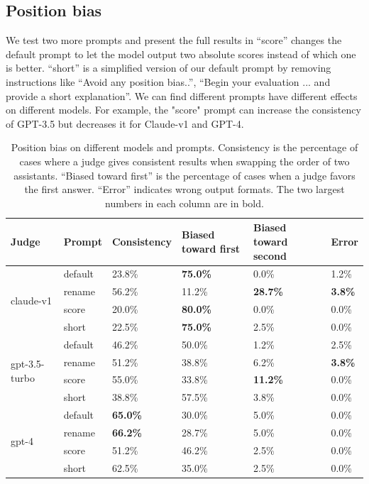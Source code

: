 \subsection{Position bias}
\label{subsec:additional-position-bias}
We test two more prompts and present the full results in 
``score'' changes the default prompt to let the model output two absolute scores instead of which one is better.
``short'' is a simplified version of our default prompt by removing instructions like ``Avoid any position bias..'', ``Begin your evaluation ... and provide a short explanation''.
We can find different prompts have different effects on different models.
For example, the "score" prompt can increase the consistency of GPT-3.5 but decreases it for Claude-v1 and GPT-4.

\begin{table}[h]
\centering
\footnotesize
\caption{Position bias on different models and prompts. Consistency is the percentage of cases where a judge gives consistent results when swapping the order of two assistants. ``Biased toward first'' is the percentage of cases when a judge favors the first answer. ``Error'' indicates wrong output formats. The two largest numbers in each column are in bold.}
\label{tab:position_bias_more_prompt}
\begin{tabular}{@{}llllll@{}}
\toprule
Judge & Prompt  & Consistency & Biased toward first & Biased toward second & Error \\
\midrule
\multirow{4}{*}{claude-v1} & default & 23.8\% & \textbf{75.0\%} & 0.0\% & 1.2\% \\
 & rename & 56.2\% & 11.2\% & \textbf{28.7\%} & \textbf{3.8\%} \\
 & score & 20.0\% & \textbf{80.0\%} & 0.0\% & 0.0\% \\
 & short & 22.5\% & \textbf{75.0\%} & 2.5\% & 0.0\% \\
\midrule
\multirow{4}{*}{gpt-3.5-turbo} & default & 46.2\% & 50.0\% & 1.2\% & 2.5\% \\
 & rename & 51.2\% & 38.8\% & 6.2\% & \textbf{3.8\%} \\
 & score & 55.0\% & 33.8\% & \textbf{11.2\%} & 0.0\% \\
 & short & 38.8\% & 57.5\% & 3.8\% & 0.0\% \\
\midrule
\multirow{4}{*}{gpt-4} & default & \textbf{65.0\%} & 30.0\% & 5.0\% & 0.0\% \\
 & rename & \textbf{66.2\%} & 28.7\% & 5.0\% & 0.0\% \\
 & score & 51.2\% & 46.2\% & 2.5\% & 0.0\% \\
 & short & 62.5\% & 35.0\% & 2.5\% & 0.0\% \\
\bottomrule
\end{tabular}
\end{table}

